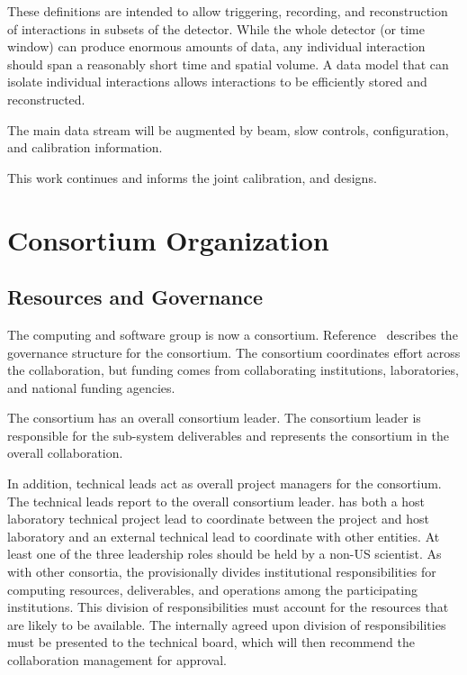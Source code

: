 These definitions are intended to allow triggering, recording, and reconstruction of interactions in subsets of the detector. While the whole detector (or time window) can produce enormous amounts of data, any individual interaction should span a reasonably short time and spatial volume. A data model that can isolate individual interactions  allows interactions to be efficiently stored and reconstructed. 


The main data stream will be augmented by beam, slow controls,  configuration, and calibration information. 

This work continues and informs  the  joint  calibration,  and  designs.


\section{Consortium Organization}



\subsection{Resources and Governance}
\label{ch:exec-comp-gov}

The computing and software group is now a  consortium.  Reference~\cite{bib:docdb12751} describes the governance structure for the consortium.  The consortium coordinates effort across the collaboration, but funding comes from collaborating institutions, laboratories, and national funding agencies. 

The consortium has an overall consortium leader. The consortium leader is responsible for the sub-system deliverables and represents the consortium in the overall  collaboration.

In addition, technical leads act as overall project managers for the consortium. The technical leads report to the overall consortium leader.
 has both a host laboratory technical project lead to coordinate between the  project and host laboratory and an external technical lead to coordinate with other entities.
At least one of the three leadership roles should be held by a non-US scientist. 
As with other  consortia, the  provisionally divides institutional
responsibilities for computing resources, deliverables, and operations among the participating institutions. This division of responsibilities must account for the resources that are likely to be available. The internally agreed upon division of responsibilities must be presented to the technical board, which will then recommend the collaboration management for approval.



